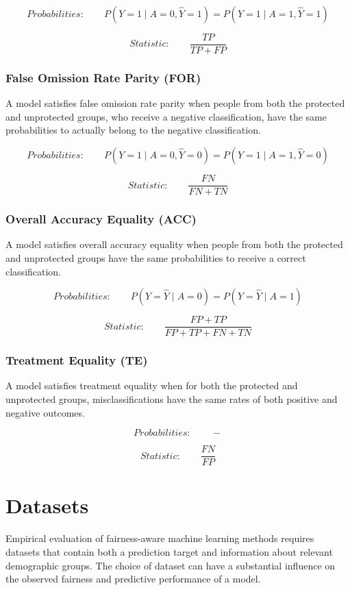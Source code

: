 \[
Probabilities:\qquad
P(Y=1\mid A=0, \hat{Y}=1)=P(Y=1\mid A=1, \hat{Y}=1)
\]

\[
Statistic:\qquad
\frac{TP}{TP+FP}
\]

\subsubsection{False Omission Rate Parity (FOR)}
A model satisfies false omission rate parity when people from both the protected and unprotected groups, who receive a negative classification, have the same probabilities to actually belong to the negative classification.


\[
Probabilities:\qquad
P(Y=1\mid A=0, \hat{Y}=0)=P(Y=1\mid A=1, \hat{Y}=0)
\]

\[
Statistic:\qquad
\frac{FN}{FN+TN}
\]

\subsubsection{Overall Accuracy Equality (ACC)}
A model satisfies overall accuracy equality when people from both the protected and unprotected groups have the same probabilities to receive a correct classification.

\[
Probabilities:\qquad
P(Y=\hat{Y}\mid A=0)=P(Y=\hat{Y}\mid A=1)
\]

\[
Statistic:\qquad
\frac{FP+TP}{FP+TP+FN+TN}
\]


\subsubsection{Treatment Equality (TE)}
A model satisfies treatment equality when for both the protected and unprotected groups, misclassifications have the same rates of both positive and negative outcomes.

\[
Probabilities:\qquad
-
\]

\[
Statistic:\qquad
\frac{FN}{FP}
\]


\section{Datasets}
Empirical evaluation of fairness-aware machine learning methods requires datasets that contain both a prediction target and information about relevant demographic groups. The choice of dataset can have a substantial influence on the observed fairness and predictive performance of a model.

